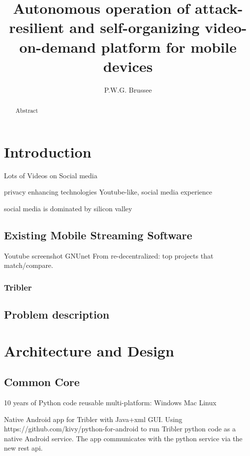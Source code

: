 \documentclass[]{report}
\title{Autonomous operation of attack-resilient and self-organizing video-on-demand  platform for mobile devices}
\author{P.W.G. Brussee}
\begin{document}
\maketitle

\begin{abstract}
	Abstract
\end{abstract}


\chapter{Introduction}
Lots of Videos on Social media \cite{REF}

privacy enhancing technologies
Youtube-like, social media experience

social media is dominated by silicon valley


\section{Existing Mobile Streaming Software}



Youtube screenshot
GNUnet
From re-decentralized: top projects that match/compare.

\subsection{Tribler}


\section{Problem description}



\chapter{Architecture and Design}

\section{Common Core}
10 years of Python code 
reusable multi-platform: Windows Mac Linux


Native Android app for Tribler with Java+xml GUI.
Using https://github.com/kivy/python-for-android to run Tribler python code as a native Android service.
The app communicates with the python service via the new rest api.
\end{document}
